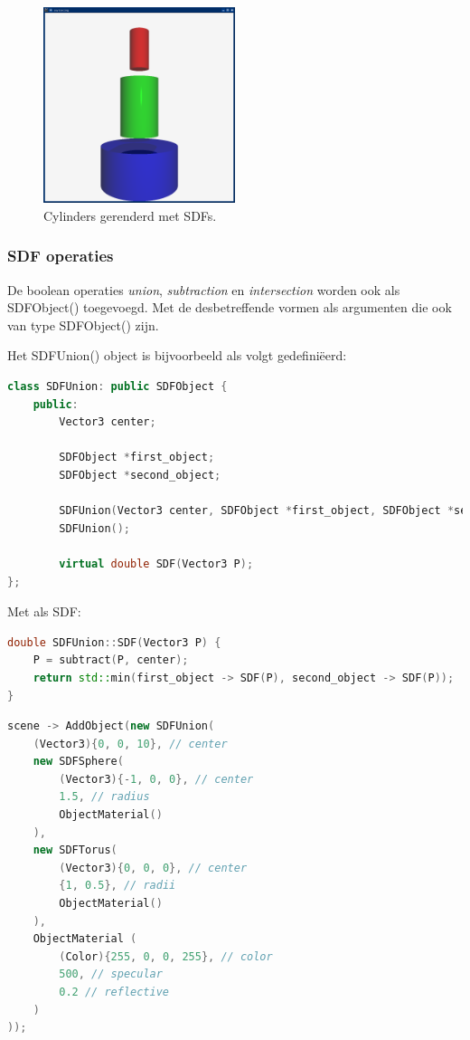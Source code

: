 \documentclass[12pt, a4paper]{article}
\begin{document}
\begin{figure}[h]
    \centering
    \includegraphics[width=0.50\textwidth]{renders/cylinders.png}
    \caption{Cylinders gerenderd met SDFs.}
    \label{fig:cylinders}
\end{figure}


\subsubsection{SDF operaties}

De boolean operaties \emph{union}, \emph{subtraction} en \emph{intersection} worden ook als SDFObject() toegevoegd. Met de desbetreffende vormen als argumenten die ook van type SDFObject() zijn.

Het SDFUnion() object is bijvoorbeeld als volgt gedefiniëerd:

\begin{lstlisting}[language=C++]
class SDFUnion: public SDFObject {
    public:
        Vector3 center;
        
        SDFObject *first_object;
        SDFObject *second_object;

        SDFUnion(Vector3 center, SDFObject *first_object, SDFObject *second_object, ObjectMaterial material);
        SDFUnion();

        virtual double SDF(Vector3 P);
};
\end{lstlisting}

Met als SDF:

\begin{lstlisting}[language=C++]
double SDFUnion::SDF(Vector3 P) {
    P = subtract(P, center);
    return std::min(first_object -> SDF(P), second_object -> SDF(P));
}
\end{lstlisting}

\begin{lstlisting}[language=C++]
scene -> AddObject(new SDFUnion(
    (Vector3){0, 0, 10}, // center
    new SDFSphere(
        (Vector3){-1, 0, 0}, // center
        1.5, // radius
        ObjectMaterial()
    ),
    new SDFTorus(
        (Vector3){0, 0, 0}, // center
        {1, 0.5}, // radii
        ObjectMaterial()
    ),
    ObjectMaterial (
        (Color){255, 0, 0, 255}, // color
        500, // specular
        0.2 // reflective
    )
));
\end{lstlisting}
\end{document}
